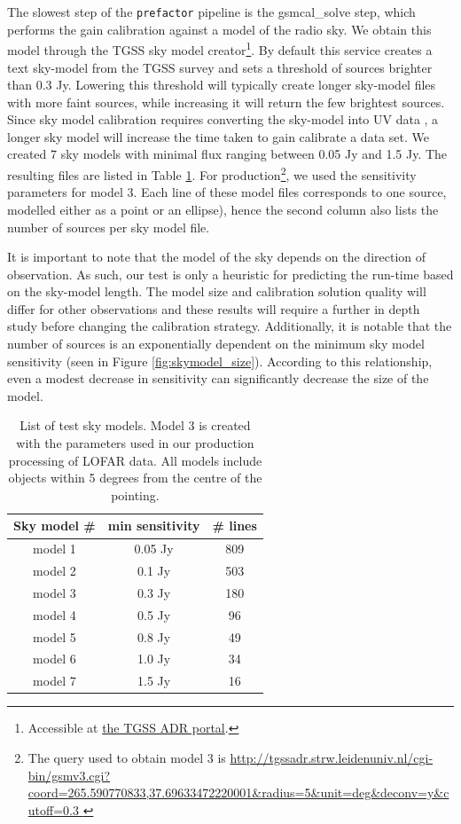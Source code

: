 The slowest step of the \texttt{prefactor} pipeline is the gsmcal\_solve step, which performs the gain calibration against a model of the radio sky. We obtain this model through the TGSS sky model creator\footnote{Accessible at \href{http://tgssadr.strw.leidenuniv.nl/doku.php}{the TGSS ADR portal}.}. By default this service creates a text sky-model from the TGSS survey \citep{tgssadr} and sets a threshold of sources brighter than 0.3 Jy. Lowering this threshold will typically  create longer sky-model files with more faint sources, while increasing it will return the few brightest sources. Since sky model calibration requires converting the sky-model into UV data \citep{dppp}, a longer sky model will increase the time taken to gain calibrate a data set. We created 7 sky models with minimal flux ranging between 0.05 Jy and 1.5 Jy. The resulting files are listed in Table \ref{table:skymodels}. For production\footnote{The query used to obtain model 3 is \url{http://tgssadr.strw.leidenuniv.nl/cgi-bin/gsmv3.cgi?coord=265.590770833,37.69633472220001\&radius=5\&unit=deg\&deconv=y\&cutoff=0.3 }}, we used the sensitivity parameters for model 3. Each line of these model files corresponds to one source, modelled either as a point or an ellipse), hence the second column also lists the number of sources per sky model file.

It is important to note that the model of the sky depends on the direction of observation. As such, our test is only a heuristic for predicting the run-time based on the sky-model length. The model size and calibration solution quality will differ for other observations and these results will require a further in depth study before changing the calibration strategy. Additionally, it is notable that the number of sources is an exponentially dependent on the minimum sky model sensitivity (seen in Figure \ref{fig:skymodel_size}). According to this relationship, even a modest decrease in sensitivity can significantly decrease the size of the model.

\begin{table}[h!]
\centering
\begin{tabular}{||c| c c||} 
 \hline
 Sky model \# & min sensitivity & \# lines  \\ [0.5ex] 
 \hline
 model 1 & 0.05 Jy & 809    \\ 
 model 2 & 0.1 Jy & 503   \\
  \hline
 model 3 & 0.3 Jy & 180   \\
  \hline
 model 4 & 0.5 Jy & 96  \\
 model 5 & 0.8 Jy & 49   \\ 
 model 6 & 1.0 Jy & 34   \\
 model 7 & 1.5 Jy & 16   \\[1ex] 
 \hline
\end{tabular}
\caption{List of test sky models. Model 3 is created with the parameters used in our production processing of LOFAR data. All models include objects within 5 degrees from the centre of the pointing.  }
\label{table:skymodels}
\end{table}


